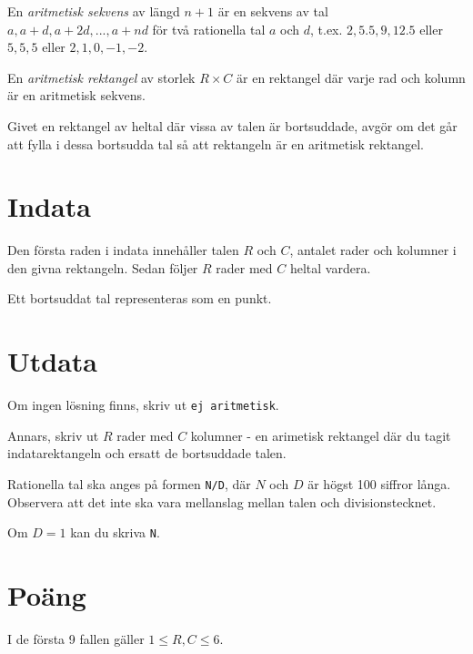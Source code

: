 
En \emph{aritmetisk sekvens} av längd $n + 1$ är en sekvens av tal $a, a + d, a + 2d, ..., a + nd$ för två rationella tal $a$ och $d$, t.ex. $2, 5.5, 9, 12.5$ eller $5, 5, 5$ eller $2, 1, 0, -1, -2$.

En \emph{aritmetisk rektangel} av storlek $R \times C$ är en rektangel där varje rad och kolumn är en aritmetisk sekvens.

Givet en rektangel av heltal där vissa av talen är bortsuddade, avgör om det går att fylla i dessa bortsudda tal så att rektangeln är en aritmetisk rektangel.

\section*{Indata}
Den första raden i indata innehåller talen $R$ och $C$, antalet rader och kolumner i den givna rektangeln. Sedan följer $R$ rader med $C$ heltal vardera.

Ett bortsuddat tal representeras som en punkt.

\section*{Utdata}
Om ingen lösning finns, skriv ut \texttt{ej aritmetisk}.

Annars, skriv ut $R$ rader med $C$ kolumner - en arimetisk rektangel där du tagit indatarektangeln och ersatt de bortsuddade talen.

Rationella tal ska anges på formen \texttt{N/D}, där $N$ och $D$ är högst 100 siffror långa. Observera att det inte ska vara mellanslag mellan talen och divisionstecknet.

Om $D = 1$ kan du skriva \texttt{N}.

\section*{Poäng}

I de första 9 fallen gäller $1 \le R, C \le 6$.

